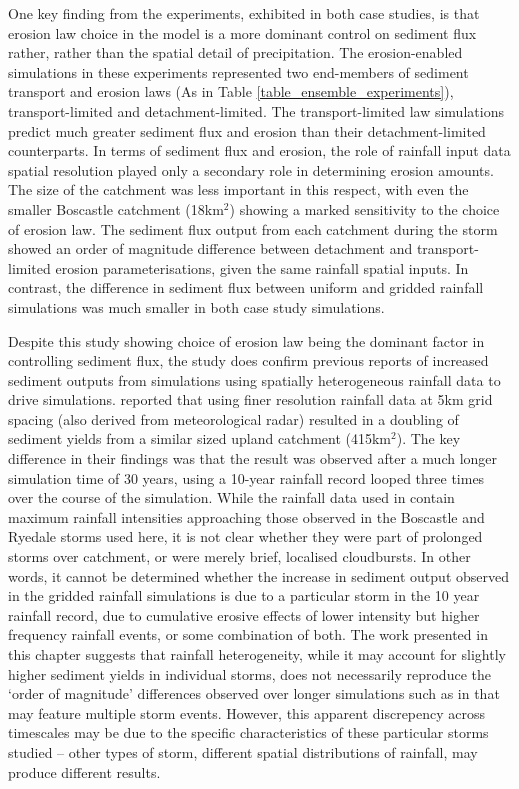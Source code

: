 One key finding from the experiments, exhibited in both case studies, is that erosion law choice in the model is a more dominant control on sediment flux rather, rather than the spatial detail of precipitation. The erosion-enabled simulations in these experiments represented two end-members of sediment transport and erosion laws (As in Table \ref{table_ensemble_experiments}), transport-limited and detachment-limited. The transport-limited law simulations predict much greater sediment flux and erosion than their detachment-limited counterparts. In terms of sediment flux and erosion, the role of rainfall input data spatial resolution played only a secondary role in determining erosion amounts. The size of the catchment was less important in this respect, with even the smaller Boscastle catchment (18km\(^2\)) showing a marked sensitivity to the choice of erosion law. The sediment flux output from each catchment during the storm showed an order of magnitude difference between detachment and transport-limited erosion parameterisations, given the same rainfall spatial inputs. In contrast, the difference in sediment flux between uniform and gridded rainfall simulations was much smaller in both case study simulations.

Despite this study showing choice of erosion law being the dominant factor in controlling sediment flux, the study does confirm previous reports of increased sediment outputs from simulations using spatially heterogeneous rainfall data to drive simulations. \citet{coulthard2016sensitivity} reported that using finer resolution rainfall data at 5km grid spacing (also derived from meteorological radar) resulted in a doubling of sediment yields from a similar sized upland catchment (415km\(^2\)). The key difference in their findings was that the result was observed after a much longer simulation time of 30 years, using a 10-year rainfall record looped three times over the course of the simulation. While the rainfall data used in \citet{coulthard2016sensitivity} contain maximum rainfall intensities approaching those observed in the Boscastle and Ryedale storms used here, it is not clear whether they were part of prolonged storms over catchment, or were merely brief, localised cloudbursts. In other words, it cannot be determined whether the increase in sediment output observed in the \citet{coulthard2016sensitivity} gridded rainfall simulations is due to a particular storm in the 10 year rainfall record, due to cumulative erosive effects of lower intensity but higher frequency rainfall events, or some combination of both. The work presented in this chapter suggests that rainfall heterogeneity, while it may account for slightly higher sediment yields in individual storms, does not necessarily reproduce the `order of magnitude' differences observed over longer simulations such as in \citet{coulthard2016sensitivity} that may feature multiple storm events. However, this apparent discrepency across timescales may be due to the specific characteristics of these particular storms studied -- other types of storm, different spatial distributions of rainfall, may produce different results.




